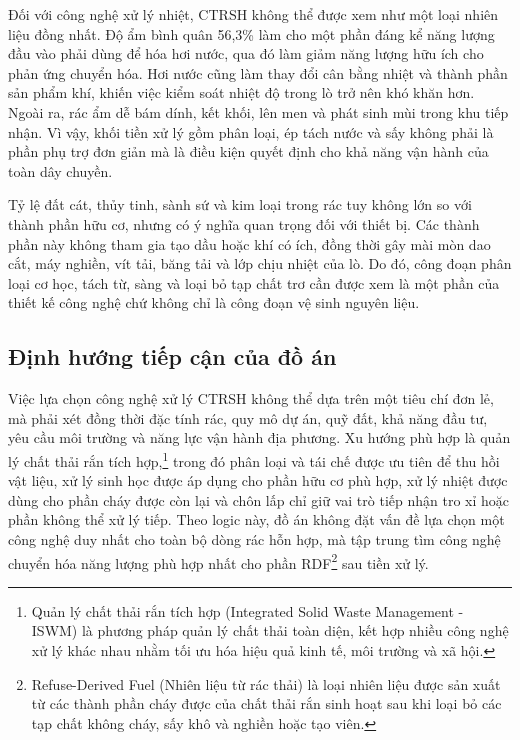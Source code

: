 \documentclass[../main.tex]{subfiles}
\begin{document}
Đối với công nghệ xử lý nhiệt, CTRSH không thể được xem như một loại nhiên liệu đồng nhất. Độ ẩm bình quân 56,3\% làm cho một phần đáng kể năng lượng đầu vào phải dùng để hóa hơi nước, qua đó làm giảm năng lượng hữu ích cho phản ứng chuyển hóa. Hơi nước cũng làm thay đổi cân bằng nhiệt và thành phần sản phẩm khí, khiến việc kiểm soát nhiệt độ trong lò trở nên khó khăn hơn. Ngoài ra, rác ẩm dễ bám dính, kết khối, lên men và phát sinh mùi trong khu tiếp nhận. Vì vậy, khối tiền xử lý gồm phân loại, ép tách nước và sấy không phải là phần phụ trợ đơn giản mà là điều kiện quyết định cho khả năng vận hành của toàn dây chuyền.

Tỷ lệ đất cát, thủy tinh, sành sứ và kim loại trong rác tuy không lớn so với thành phần hữu cơ, nhưng có ý nghĩa quan trọng đối với thiết bị. Các thành phần này không tham gia tạo dầu hoặc khí có ích, đồng thời gây mài mòn dao cắt, máy nghiền, vít tải, băng tải và lớp chịu nhiệt của lò. Do đó, công đoạn phân loại cơ học, tách từ, sàng và loại bỏ tạp chất trơ cần được xem là một phần của thiết kế công nghệ chứ không chỉ là công đoạn vệ sinh nguyên liệu.

\subsection{Định hướng tiếp cận của đồ án}
\label{sec:dinh-huong-tiep-can}

Việc lựa chọn công nghệ xử lý CTRSH không thể dựa trên một tiêu chí đơn lẻ, mà phải xét đồng thời đặc tính rác, quy mô dự án, quỹ đất, khả năng đầu tư, yêu cầu môi trường và năng lực vận hành địa phương. Xu hướng phù hợp là quản lý chất thải rắn tích hợp,\footnote{Quản lý chất thải rắn tích hợp (Integrated Solid Waste Management - ISWM) là phương pháp quản lý chất thải toàn diện, kết hợp nhiều công nghệ xử lý khác nhau nhằm tối ưu hóa hiệu quả kinh tế, môi trường và xã hội.} trong đó phân loại và tái chế được ưu tiên để thu hồi vật liệu, xử lý sinh học được áp dụng cho phần hữu cơ phù hợp, xử lý nhiệt được dùng cho phần cháy được còn lại và chôn lấp chỉ giữ vai trò tiếp nhận tro xỉ hoặc phần không thể xử lý tiếp. Theo logic này, đồ án không đặt vấn đề lựa chọn một công nghệ duy nhất cho toàn bộ dòng rác hỗn hợp, mà tập trung tìm công nghệ chuyển hóa năng lượng phù hợp nhất cho phần RDF\footnote{Refuse-Derived Fuel (Nhiên liệu từ rác thải) là loại nhiên liệu được sản xuất từ các thành phần cháy được của chất thải rắn sinh hoạt sau khi loại bỏ các tạp chất không cháy, sấy khô và nghiền hoặc tạo viên.} sau tiền xử lý.
\end{document}
